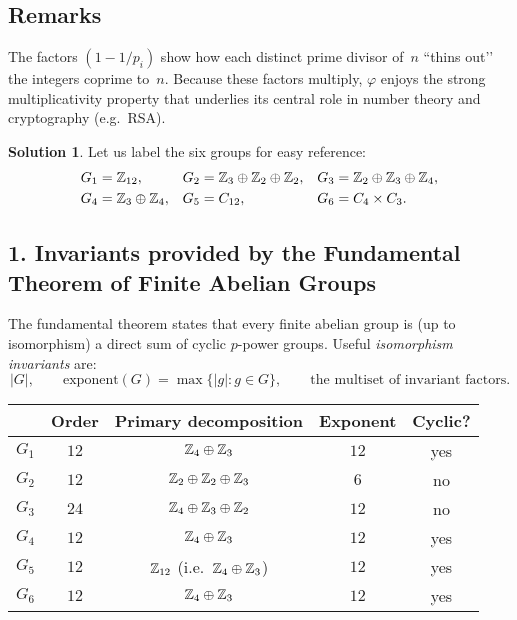 \documentclass[12pt]{article}
\theoremstyle{definition} %
\newtheorem{solution}{Solution}
\theoremstyle{plain} %
\begin{document}
\subsection{Remarks}
The factors \((1-1/p_i)\) show how each distinct prime divisor of~\(n\)
“thins out’’ the integers coprime to~\(n\).
Because these factors multiply, \(\varphi\) enjoys the strong
multiplicativity property that underlies its central role in
number theory and cryptography (e.g.\ RSA).
\begin{solution}
  Let us label the six groups for easy reference:
  \[
  \begin{aligned}
  G_1 &= \Bbb Z_{12}, &
  G_2 &= \Bbb Z_3 \oplus \Bbb Z_2 \oplus \Bbb Z_2, &
  G_3 &= \Bbb Z_2 \oplus \Bbb Z_3 \oplus \Bbb Z_4,\\
  G_4 &= \Bbb Z_3 \oplus \Bbb Z_4, &
  G_5 &= C_{12}, &
  G_6 &= C_4 \times C_3.
  \end{aligned}
  \]
  
  \subsection*{1.\;  Invariants provided by the Fundamental Theorem of Finite Abelian Groups}
  The fundamental theorem states that every finite abelian group is (up to
  isomorphism) a direct sum of cyclic \(p\)-power groups.  Useful
  \emph{isomorphism invariants} are:
  \[
  \lvert G\rvert,\qquad
  \text{exponent}(G)=\max\{\lvert g\rvert:g\in G\},\qquad
  \text{the multiset of invariant factors.}
  \]
  
  \begin{center}
  \renewcommand{\arraystretch}{1.15}
  \begin{tabular}{c|c c c c}
   & Order & Primary decomposition & Exponent & Cyclic?\\\hline
  \(G_1\) & \(12\) & \(\Bbb Z_4\oplus\Bbb Z_3\) & \(12\) & yes\\
  \(G_2\) & \(12\) & \(\Bbb Z_2\oplus\Bbb Z_2\oplus\Bbb Z_3\) & \(6\)  & no\\
  \(G_3\) & \(24\) & \(\Bbb Z_4\oplus\Bbb Z_3\oplus\Bbb Z_2\) & \(12\) & no\\
  \(G_4\) & \(12\) & \(\Bbb Z_4\oplus\Bbb Z_3\) & \(12\) & yes\\
  \(G_5\) & \(12\) & \(\Bbb Z_{12}\) (i.e.\ \(\Bbb Z_4\oplus\Bbb Z_3\)) & \(12\) & yes\\
  \(G_6\) & \(12\) & \(\Bbb Z_4\oplus\Bbb Z_3\) & \(12\) & yes\\
  \end{tabular}
  \end{center}
  

\end{solution}
\end{document}
